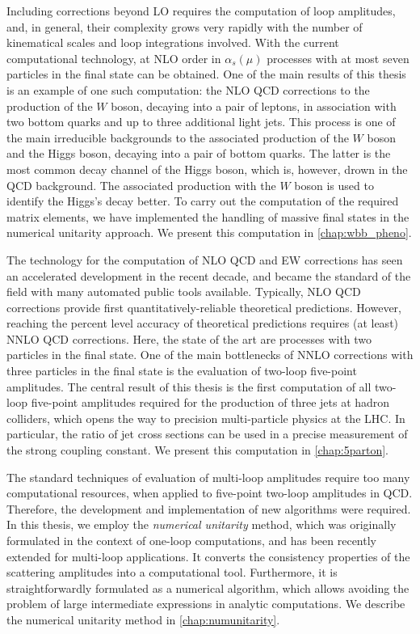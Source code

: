 Including corrections beyond LO requires the computation of loop amplitudes, and, in general,
their complexity grows very rapidly with the number of kinematical scales and loop integrations involved.
With the current computational technology, at NLO order in $\alpha_s(\mu)$ processes with at most seven particles in the final state
can be obtained. One of the main results of this thesis is an example of one such computation:
the NLO QCD corrections to the production of the $W$ boson, decaying into a pair of leptons, in association with 
two bottom quarks and up to three additional light jets. 
This process is one of the main irreducible backgrounds to the associated 
production of the $W$ boson and the Higgs boson, decaying into a pair of bottom quarks.
The latter is the most common decay channel of the Higgs boson, which is, however, drown in the QCD background.
The associated production with the $W$ boson is used to identify the Higgs's decay better.
To carry out the computation of the required matrix elements, we have implemented the handling of massive final states in the numerical unitarity approach.
We present this computation in \cref{chap:wbb_pheno}.

The technology for the computation of NLO QCD and EW corrections has seen an accelerated development
in the recent decade, and became the standard of the field with many automated public tools available.
Typically, NLO QCD corrections provide first quantitatively-reliable theoretical predictions.
However, reaching the percent level accuracy of theoretical predictions requires (at least) NNLO QCD corrections.
Here, the state of the art are processes with two particles in the final state.
One of the main bottlenecks of NNLO corrections with three particles in the final state is the evaluation of two-loop five-point amplitudes.
The central result of this thesis is the first computation of all two-loop five-point amplitudes required for the production
of three jets at hadron colliders, which opens the way to precision multi-particle physics at the LHC.
In particular, the ratio of jet cross sections can be used in a precise measurement of the strong coupling constant.
We present this computation in  \cref{chap:5parton}.

The standard techniques of evaluation of multi-loop amplitudes require too many computational resources,
when applied to five-point two-loop amplitudes in QCD.
Therefore, the development and implementation of new algorithms were required.
In this thesis, we employ the \emph{numerical unitarity} method, which
was originally formulated in the context of one-loop computations,
and has been recently extended for multi-loop applications.
It converts the consistency properties of the scattering amplitudes into a computational tool.
Furthermore, it is straightforwardly formulated as a numerical algorithm, which allows avoiding
the problem of large intermediate expressions in analytic computations.
We describe the numerical unitarity method in \cref{chap:numunitarity}.

